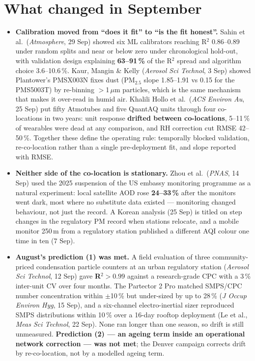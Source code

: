 \documentclass[10pt]{article}
\begin{document}
\vspace{3mm}

\section*{\sffamily\bfseries\color{Deep}What changed in September}
\vspace{-1.5mm}{\color{Coral}\rule{\linewidth}{1.1pt}}\vspace{2.5mm}

\footnotesize
\begin{itemize}
\item \textbf{Calibration moved from ``does it fit'' to ``is the fit honest''.} Sahin et al.\
(\textit{Atmosphere}, 29 Sep) showed six ML calibrators reaching R$^2$ 0.86--0.89 under random
splits and near or below zero under chronological hold-out, with validation design explaining
\textbf{63--91\,\%} of the R$^2$ spread and algorithm choice 3.6--10.6\,\%. Kaur, Mangin \& Kelly
(\textit{Aerosol Sci Technol}, 3 Sep) showed Plantower's PMSX003N fixes dust (PM$_{2.5}$ slope
1.85--1.91 vs 0.15 for the PMS5003T) by re-binning $>$1\,$\mu$m particles, which is the same mechanism
that makes it over-read in humid air. Khalili Hollo et al.\ (\textit{ACS Environ Au}, 25 Sep) put
fifty Atmotubes and five QuantAQ units through four co-locations in two years: unit response
\textbf{drifted between co-locations}, 5--11\,\% of wearables were dead at any comparison, and RH
correction cut RMSE 42--50\,\%. Together these define the operating rule: temporally blocked
validation, re-co-location rather than a single pre-deployment fit, and slope reported with RMSE.

\item \textbf{Neither side of the co-location is stationary.} Zhou et al.\ (\textit{PNAS}, 14 Sep)
used the 2025 suspension of the US embassy monitoring programme as a natural experiment: local
satellite AOD rose \textbf{24--33\,\%} after the monitors went dark, most where no substitute data
existed --- monitoring changed behaviour, not just the record. A Korean analysis (25 Sep) is
titled on step changes in the regulatory PM record when stations relocate, and a mobile monitor
250\,m from a regulatory station published a different AQI colour one time in ten (7 Sep).

\item \textbf{August's prediction (1) was met.} A field evaluation of three community-priced
condensation particle counters at an urban regulatory station (\textit{Aerosol Sci Technol},
12 Sep) gave \textbf{R$^2>0.99$} against a research-grade CPC with a 3\,\% inter-unit CV over four
months. The Partector 2 Pro matched SMPS/CPC number concentration within $\pm$10\,\% but under-sized
by up to 28\,\% (\textit{J Occup Environ Hyg}, 15 Sep), and a six-channel electro-inertial sizer
reproduced SMPS distributions within 10\,\% over a 16-day rooftop deployment (Le et al.,
\textit{Meas Sci Technol}, 22 Sep). None ran longer than one season, so drift is still unmeasured.
\textbf{Prediction (2) --- an ageing term inside an operational network correction --- was not
met}; the Denver campaign corrects drift by re-co-location, not by a modelled ageing term.


\end{itemize}
\end{document}
